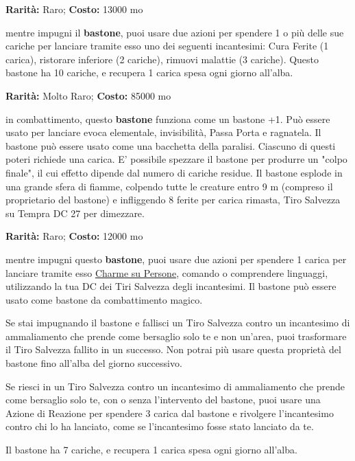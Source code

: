 \begin{multicols}{2}

\textbf{Rarità:} Raro; \textbf{Costo:} 13000 mo

mentre impugni il \textbf{bastone}, puoi usare due azioni per spendere 1 o più delle sue cariche per lanciare tramite esso uno dei seguenti incantesimi: Cura Ferite (1 carica), ristorare inferiore (2 cariche), rimuovi malattie (3 cariche). Questo bastone ha 10 cariche, e recupera 1 carica spesa ogni giorno all'alba.


\textbf{Rarità:} Molto Raro; \textbf{Costo:} 85000 mo

in combattimento, questo \textbf{bastone} funziona come un bastone +1. Può essere usato per lanciare evoca elementale, invisibilità, Passa Porta e ragnatela. Il bastone può essere usato come una bacchetta della paralisi. Ciascuno di questi poteri richiede una carica. E' possibile spezzare il bastone per produrre un "colpo finale", il cui effetto dipende dal numero di cariche residue. Il bastone esplode in una grande sfera di fiamme, colpendo tutte le creature entro 9 m (compreso il proprietario del bastone) e infliggendo 8 ferite per carica rimasta, Tiro Salvezza su Tempra DC 27 per dimezzare.


\textbf{Rarità:} Raro; \textbf{Costo:} 12000 mo

mentre impugni questo \textbf{bastone}, puoi usare due azioni per spendere 1 carica per lanciare tramite esso \hyperlink{Charme su Persone}{Charme su Persone}, comando o comprendere linguaggi, utilizzando la tua DC dei Tiri Salvezza degli incantesimi. Il bastone può essere usato come bastone da combattimento magico.

Se stai impugnando il bastone e fallisci un Tiro Salvezza contro un incantesimo di ammaliamento che prende come bersaglio solo te e non un'area, puoi trasformare il Tiro Salvezza fallito in un successo. Non potrai più usare questa proprietà del bastone fino all'alba del giorno successivo.

Se riesci in un Tiro Salvezza contro un incantesimo di ammaliamento che prende come bersaglio solo te, con o senza l'intervento del bastone, puoi usare una Azione di Reazione per spendere 3 carica dal bastone e rivolgere l'incantesimo contro chi lo ha lanciato, come se l'incantesimo fosse stato lanciato da te.

Il bastone ha 7 cariche, e recupera 1 carica spesa ogni giorno all'alba.


\end{multicols}
